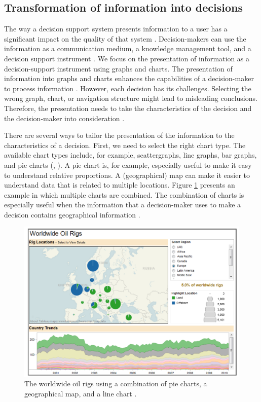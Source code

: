 \subsection{Transformation of information into decisions} \label{tf_transformation_of_information}
The way a decision support system presents information to a user has a significant impact on the quality of that system \parencite{BI03}. Decision-makers can use the information as a communication medium, a knowledge management tool, and a decision support instrument \parencite{BI02}. We focus on the presentation of information as a decision-support instrument using graphs and charts. The presentation of information into graphs and charts enhances the capabilities of a decision-maker to process information \parencite{BI06}. However, each decision has its challenges. Selecting the wrong graph, chart, or navigation structure might lead to misleading conclusions. Therefore, the presentation needs to take the characteristics of the decision and the decision-maker into consideration \parencite{BI02}.

There are several ways to tailor the presentation of the information to the characteristics of a decision. First, we need to select the right chart type. The available chart types include, for example, scattergraphs, line graphs, bar graphs, and pie charts (\cite{BI09}, \cite{OTH09}). A pie chart is, for example, especially useful to make it easy to understand relative proportions. A (geographical) map can make it easier to understand data that is related to multiple locations.  Figure \ref{fig:visualisation_pattern} presents an example in which multiple charts are combined. The combination of charts is especially useful when the information that a decision-maker uses to make a decision contains geographical information \parencite{OTH09}.

\begin{figure}[H]
\centering
  \includegraphics[width=12cm]{../../Images/02_TF_Visualisation_Pattern.png}
  \caption{The worldwide oil rigs using a combination of pie charts, a geographical map, and a line chart \parencite{OTH09}.}
  \label{fig:visualisation_pattern}
\end{figure}

